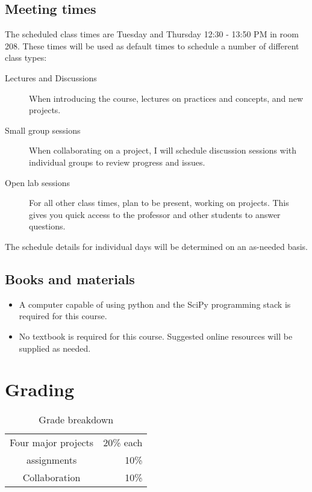 \documentclass[12pt]{article}
\begin{document}
\subsection*{Meeting times}

The scheduled class times are Tuesday and Thursday 12:30 - 13:50 PM in room 208. These times will be used as default times to schedule a number of different class types:
\begin{description}
\item[Lectures and Discussions] When introducing the course, lectures on practices and concepts, and new projects.
\item[Small group sessions] When collaborating on a project, I will schedule discussion sessions with individual groups to review progress and issues.
\item[Open lab sessions] For all other class times, plan to be present, working on projects. This gives you quick access to the professor and other students to answer questions.

\end{description}
The schedule details for individual days will be determined on an as-needed basis.

\subsection*{Books and materials}

\begin{itemize}
\item A computer capable of using python and the SciPy programming stack is required for this course.
\item No textbook is required for this course. Suggested online resources will be supplied as needed.
\end{itemize}
 
\section*{Grading}

\begin{table}[h]
  \caption{Grade breakdown}
\begin{center}
  \begin{tabular}{cr}
	\toprule
    Four major projects & 20\% each \\
    assignments & 10\% \\
    Collaboration & 10\% \\
    \bottomrule
  \end{tabular}
\end{center}
\end{table}
\end{document}
